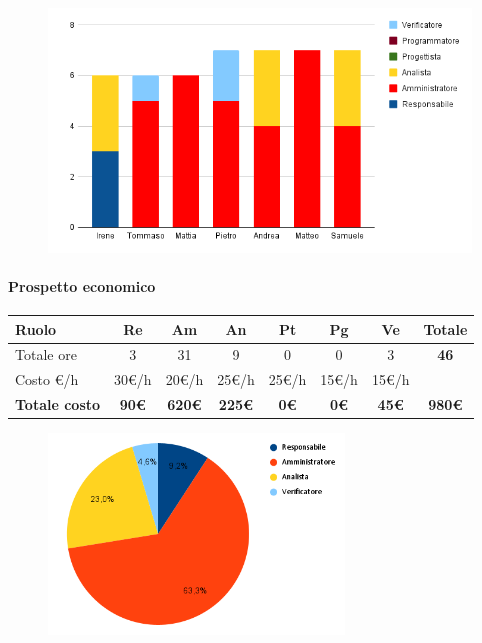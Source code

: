 \begin{figure}[H]
    \centering\includegraphics[width=\textwidth, height=\textheight, keepaspectratio]{images/preventivo/RTB-documentale-ore.png}
\end{figure}


\paragraph{Prospetto economico}
\begin{center}
	\renewcommand{\arraystretch}{1.8} %
	\begin{tabular}{ |m{10em}|c|c|c|c|c|c|c| }
	\hline
	\textbf{Ruolo} & \textbf{Re} & \textbf{Am} &  \textbf{An} &  \textbf{Pt} &  \textbf{Pg} &  \textbf{Ve} &  \textbf{Totale}\\
    \hline
    Totale ore & 3 & 31 & 9 & 0 & 0 & 3 & \textbf{46}\\
    \hline
    Costo \euro/h & 30\euro/h & 20\euro/h & 25\euro/h & 25\euro/h & 15\euro/h & 15\euro/h & \\
    \hline
    \textbf{Totale costo} & \textbf{90\euro} & \textbf{620\euro} &  \textbf{225\euro} &  \textbf{0\euro} &  \textbf{0\euro} &  \textbf{45\euro} &  \textbf{980\euro}\\
    \hline
	\end{tabular}

    \begin{figure}[H]
        \centering\includegraphics[width=0.7\textwidth, height=0.7\textheight, keepaspectratio]{images/preventivo/RTB-documentale-costo.png}
    \end{figure}
\end{center}


